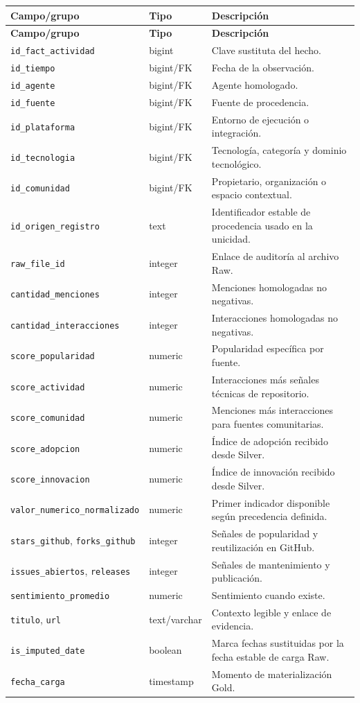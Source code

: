 \documentclass[12pt,a4paper]{article}
\newcommand{\pathcode}[1]{\begingroup\small\ttfamily\nolinkurl{#1}\endgroup}
\begin{document}
\small
\begin{longtable}{P{4.1cm} P{2.8cm} P{7.0cm}}
\toprule
{}
\textbf{Campo/grupo} & \textbf{Tipo} & \textbf{Descripción} \\
\midrule
\endfirsthead
\toprule
{}
\textbf{Campo/grupo} & \textbf{Tipo} & \textbf{Descripción} \\
\midrule
\endhead
\pathcode{id_fact_actividad} & bigint & Clave sustituta del hecho. \\
\pathcode{id_tiempo} & bigint/FK & Fecha de la observación. \\
\pathcode{id_agente} & bigint/FK & Agente homologado. \\
\pathcode{id_fuente} & bigint/FK & Fuente de procedencia. \\
\pathcode{id_plataforma} & bigint/FK & Entorno de ejecución o integración. \\
\pathcode{id_tecnologia} & bigint/FK & Tecnología, categoría y dominio tecnológico. \\
\pathcode{id_comunidad} & bigint/FK & Propietario, organización o espacio contextual. \\
\pathcode{id_origen_registro} & text & Identificador estable de procedencia usado en la unicidad. \\
\pathcode{raw_file_id} & integer & Enlace de auditoría al archivo Raw. \\
\pathcode{cantidad_menciones} & integer & Menciones homologadas no negativas. \\
\pathcode{cantidad_interacciones} & integer & Interacciones homologadas no negativas. \\
\pathcode{score_popularidad} & numeric & Popularidad específica por fuente. \\
\pathcode{score_actividad} & numeric & Interacciones más señales técnicas de repositorio. \\
\pathcode{score_comunidad} & numeric & Menciones más interacciones para fuentes comunitarias. \\
\pathcode{score_adopcion} & numeric & Índice de adopción recibido desde Silver. \\
\pathcode{score_innovacion} & numeric & Índice de innovación recibido desde Silver. \\
\pathcode{valor_numerico_normalizado} & numeric & Primer indicador disponible según precedencia definida. \\
\pathcode{stars_github}, \pathcode{forks_github} & integer & Señales de popularidad y reutilización en GitHub. \\
\pathcode{issues_abiertos}, \pathcode{releases} & integer & Señales de mantenimiento y publicación. \\
\pathcode{sentimiento_promedio} & numeric & Sentimiento cuando existe. \\
\pathcode{titulo}, \pathcode{url} & text/varchar & Contexto legible y enlace de evidencia. \\
\pathcode{is_imputed_date} & boolean & Marca fechas sustituidas por la fecha estable de carga Raw. \\
\pathcode{fecha_carga} & timestamp & Momento de materialización Gold. \\
\bottomrule
\end{longtable}
\normalsize
\end{document}
